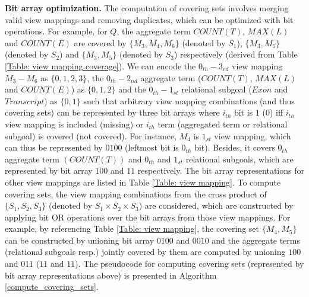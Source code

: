 \textbf{Bit array optimization.} The computation of covering sets involves merging valid view mappings and removing duplicates, which can be optimized with bit operations. For example, for $Q$, the aggregate term $COUNT(T)$, $MAX(L)$ and $COUNT(E)$ are covered by $\{M_3, M_4, M_6\}$ (denoted by $S_1$), $\{M_3, M_5\}$ (denoted by $S_2$) and $\{M_3, M_5\}$ (denoted by $S_3$) respectively (derived from Table \ref{Table: view mapping coverage}). We can encode the $0_{th}-3_{rd}$ view mapping $M_3-M_6$ as $\{0,1,2,3\}$, the $0_{th}-2_{nd}$ aggregate term ($COUNT(T)$, $MAX(L)$ and $COUNT(E)$) as $\{0, 1, 2\}$ and the $0_{th}-1_{st}$ relational subgoal ($Exon$ and $Transcript$) as $\{0, 1\}$ such that arbitrary view mapping combinations (and thus covering sets) can be represented by three bit arrays where $i_{th}$ bit is 1 (0) iff $i_{th}$ view mapping is included (missing) or $i_{th}$ term (aggregated term or relational subgoal) is covered (not covered). For instance, $M_4$ is $1_{st}$ view mapping, which can thus be represented by $0100$ (leftmost bit is $0_{th}$ bit). Besides, it covers $0_{th}$ aggregate term $(COUNT(T))$ and $0_{th}$  and $1_{st}$ relational subgoals, which are represented by bit array $100$ and $11$ respectively. The bit array representations for other view mappings are listed in Table \ref{Table: view mapping}. To compute covering sets, the view mapping combinations from the cross product of $\{S_1, S_2, S_3\}$ (denoted by $S_1 \times S_2 \times S_3$) are considered, which are constructed by applying bit OR operations over the bit arrays from those view mappings. For example, by referencing Table \ref{Table: view mapping}, the covering set $\{M_4, M_5\}$ can be constructed by unioning bit array $0100$ and $0010$ and the aggregate terms (relational subgoals resp.) jointly covered by them are computed by unioning $100$ and $011$ ($11$ and $11$). The pseudocode for computing covering sets (represented by bit array representations above) is presented in Algorithm \ref{compute_covering_sets}.

